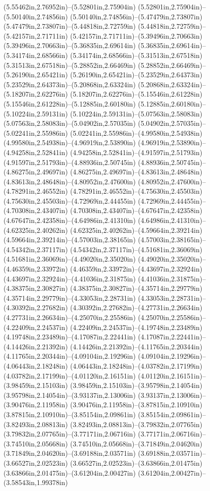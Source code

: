 (5.55462in,2.76952in)--(5.52801in,2.75904in) (5.52801in,2.75904in)--(5.50140in,2.74856in) (5.50140in,2.74856in)--(5.47479in,2.73807in) (5.47479in,2.73807in)--(5.44818in,2.72759in) (5.44818in,2.72759in)--(5.42157in,2.71711in) (5.42157in,2.71711in)--(5.39496in,2.70663in) (5.39496in,2.70663in)--(5.36835in,2.69614in) (5.36835in,2.69614in)--(5.34174in,2.68566in) (5.34174in,2.68566in)--(5.31513in,2.67518in) (5.31513in,2.67518in)--(5.28852in,2.66469in) (5.28852in,2.66469in)--(5.26190in,2.65421in) (5.26190in,2.65421in)--(5.23529in,2.64373in) (5.23529in,2.64373in)--(5.20868in,2.63324in) (5.20868in,2.63324in)--(5.18207in,2.62276in) (5.18207in,2.62276in)--(5.15546in,2.61228in) (5.15546in,2.61228in)--(5.12885in,2.60180in) (5.12885in,2.60180in)--(5.10224in,2.59131in) (5.10224in,2.59131in)--(5.07563in,2.58083in) (5.07563in,2.58083in)--(5.04902in,2.57035in) (5.04902in,2.57035in)--(5.02241in,2.55986in) (5.02241in,2.55986in)--(4.99580in,2.54938in) (4.99580in,2.54938in)--(4.96919in,2.53890in) (4.96919in,2.53890in)--(4.94258in,2.52841in) (4.94258in,2.52841in)--(4.91597in,2.51793in) (4.91597in,2.51793in)--(4.88936in,2.50745in) (4.88936in,2.50745in)--(4.86275in,2.49697in) (4.86275in,2.49697in)--(4.83613in,2.48648in) (4.83613in,2.48648in)--(4.80952in,2.47600in) (4.80952in,2.47600in)--(4.78291in,2.46552in) (4.78291in,2.46552in)--(4.75630in,2.45503in) (4.75630in,2.45503in)--(4.72969in,2.44455in) (4.72969in,2.44455in)--(4.70308in,2.43407in) (4.70308in,2.43407in)--(4.67647in,2.42358in) (4.67647in,2.42358in)--(4.64986in,2.41310in) (4.64986in,2.41310in)--(4.62325in,2.40262in) (4.62325in,2.40262in)--(4.59664in,2.39214in) (4.59664in,2.39214in)--(4.57003in,2.38165in) (4.57003in,2.38165in)--(4.54342in,2.37117in) (4.54342in,2.37117in)--(4.51681in,2.36069in) (4.51681in,2.36069in)--(4.49020in,2.35020in) (4.49020in,2.35020in)--(4.46359in,2.33972in) (4.46359in,2.33972in)--(4.43697in,2.32924in) (4.43697in,2.32924in)--(4.41036in,2.31875in) (4.41036in,2.31875in)--(4.38375in,2.30827in) (4.38375in,2.30827in)--(4.35714in,2.29779in) (4.35714in,2.29779in)--(4.33053in,2.28731in) (4.33053in,2.28731in)--(4.30392in,2.27682in) (4.30392in,2.27682in)--(4.27731in,2.26634in) (4.27731in,2.26634in)--(4.25070in,2.25586in) (4.25070in,2.25586in)--(4.22409in,2.24537in) (4.22409in,2.24537in)--(4.19748in,2.23489in) (4.19748in,2.23489in)--(4.17087in,2.22441in) (4.17087in,2.22441in)--(4.14426in,2.21392in) (4.14426in,2.21392in)--(4.11765in,2.20344in) (4.11765in,2.20344in)--(4.09104in,2.19296in) (4.09104in,2.19296in)--(4.06443in,2.18248in) (4.06443in,2.18248in)--(4.03782in,2.17199in) (4.03782in,2.17199in)--(4.01120in,2.16151in) (4.01120in,2.16151in)--(3.98459in,2.15103in) (3.98459in,2.15103in)--(3.95798in,2.14054in) (3.95798in,2.14054in)--(3.93137in,2.13006in) (3.93137in,2.13006in)--(3.90476in,2.11958in) (3.90476in,2.11958in)--(3.87815in,2.10910in) (3.87815in,2.10910in)--(3.85154in,2.09861in) (3.85154in,2.09861in)--(3.82493in,2.08813in) (3.82493in,2.08813in)--(3.79832in,2.07765in) (3.79832in,2.07765in)--(3.77171in,2.06716in) (3.77171in,2.06716in)--(3.74510in,2.05668in) (3.74510in,2.05668in)--(3.71849in,2.04620in) (3.71849in,2.04620in)--(3.69188in,2.03571in) (3.69188in,2.03571in)--(3.66527in,2.02523in) (3.66527in,2.02523in)--(3.63866in,2.01475in) (3.63866in,2.01475in)--(3.61204in,2.00427in) (3.61204in,2.00427in)--(3.58543in,1.99378in) 